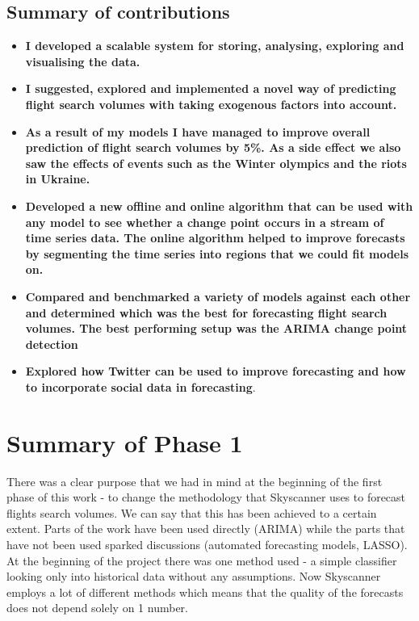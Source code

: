 \documentclass[minf,twoside,singlespacing,parskip,notimes,deptreport]{infthesis} %
\begin{document}
\newpage
\section{Summary of contributions}

\begin{itemize}
\item \textbf{I developed a scalable system for storing, analysing, exploring and visualising the data.}
\item \textbf{I suggested, explored and implemented a novel way of predicting flight search volumes with taking exogenous factors into account.}
\item \textbf{As a result of my models I have managed to improve overall prediction of flight search volumes by 5\%. As a side effect we also saw the effects of events such as the Winter olympics and the riots in Ukraine.} 
\item \textbf{Developed a new offline and online algorithm that can be used with any model to see whether a change point occurs in a stream of time series data. The online algorithm helped to improve forecasts by segmenting the time series into regions that we could fit models on.} 
\item \textbf{Compared and benchmarked a variety of models against each other and determined which was the best for forecasting flight search volumes. The best performing setup was the ARIMA change point detection}
\item \textbf{Explored how Twitter can be used to improve forecasting and how to incorporate social data in forecasting}.
\end{itemize}



\chapter{Summary of Phase 1}

There was a clear purpose that we had in mind at the beginning of the first phase of this work - to change the methodology that Skyscanner uses to forecast flights search volumes. We can say that this has been achieved to a certain extent. Parts of the work have been used directly (ARIMA) while the parts that have not been used sparked discussions (automated forecasting models, LASSO). At the beginning of the project there was one method used - a simple classifier looking only into historical data without any assumptions. Now Skyscanner employs a lot of different methods which means that the quality of the forecasts does not depend solely on 1 number. 
\end{document}

